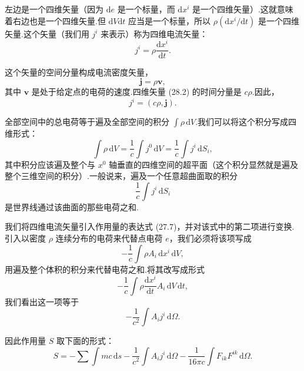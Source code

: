 左边是一个四维矢量（因为 $\mathrm{d}e$ 是一个标量，而 $\mathrm{d}x^i$
是一个四维矢量）.这就意味着右边也是一个四维矢量.但 $\mathrm{d}V\mathrm{d}t$
应当是一个标量，所以 $\rho(\mathrm{d}x^i/\mathrm{d}t)$
是一个四维矢量.这个矢量（我们用 $j^i$ 来表示）称为四维电流矢量：
\begin{equation}
  j^i=\rho\frac{\mathrm{d}x^i}{\mathrm{d}t}.
\end{equation}

这个矢量的空间分量构成电流密度矢量，
\begin{equation}
  \boldsymbol{j}=\rho\boldsymbol{v},
\end{equation}
其中 $\boldsymbol{v}$ 是处于给定点的电荷的速度.四维矢量 (28.2) 的时间分量是 $c\rho$.因此，
\begin{equation}
  j^i=(c\rho,\boldsymbol{j}).
\end{equation}

全部空间中的总电荷等于遍及全部空间的积分 $\int\rho\,\mathrm{d}V$.我们可以将这个积分写成四维形式：
\begin{equation}
  \int\rho\,\mathrm{d}V=\frac{1}{c}\int j^0\,\mathrm{d}V
  =\frac{1}{c}\int j^i\,\mathrm{d}S_i,
\end{equation}
其中积分应该遍及整个与 $x^0$
轴垂直的四维空间的超平面（这个积分显然就是遍及整个三维空间的积分）.一般说来，遍及一个任意超曲面取的积分
\begin{equation*}
  \frac{1}{c}\int j^i\,\mathrm{d}S_i
\end{equation*}
是世界线通过该曲面的那些电荷之和.

我们将四维电流矢量引入作用量的表达式 (27.7)，并对该式中的第二项进行变换.引入以密度 $\rho$
连续分布的电荷来代替点电荷 $e$，我们必须将该项写成
\begin{equation*}
  -\frac{1}{c}\int\rho A_i\,\mathrm{d}x^i\,\mathrm{d}V,
\end{equation*}
用遍及整个体积的积分来代替电荷之和.将其改写成形式
\begin{equation*}
  -\frac{1}{c}\int\rho\frac{\mathrm{d}x^i}{\mathrm{d}t}A_i\,\mathrm{d}V\,\mathrm{d}t,
\end{equation*}
我们看出这一项等于
\begin{equation*}
  -\frac{1}{c^2}\int A_i j^i\,\mathrm{d}\varOmega.
\end{equation*}

因此作用量 $S$ 取下面的形式：
\begin{equation}
  S=-\sum\int mc\,\mathrm{d}s-\frac{1}{c^2}\int A_i j^i\,\mathrm{d}\varOmega
  -\frac{1}{16\pi c}\int F_{ik}F^{ik}\,\mathrm{d}\varOmega.
\end{equation}

